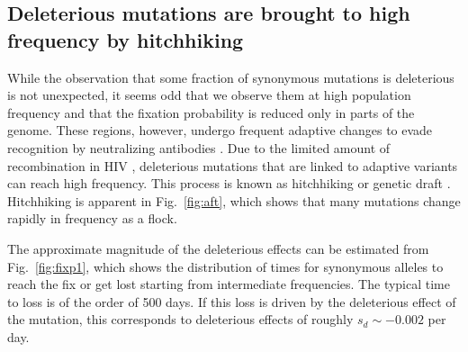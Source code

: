 \documentclass[rmp, twocolumn]{revtex4}
\newcommand{\FIG}[1]{Fig.~\ref{fig:#1}}
\begin{document}
\subsection{Deleterious mutations are brought to high frequency by hitchhiking}

While the observation that some fraction of synonymous mutations is deleterious
is not unexpected, it seems odd that we observe them at high population
frequency and that the fixation probability is reduced only in parts of the
genome. These regions, however, undergo frequent adaptive changes to evade
recognition by neutralizing antibodies \cite{williamson_adaptation_2003,
richman_rapid_2003}. Due to the limited amount of recombination in HIV
\cite{neher_recombination_2010, batorsky_estimate_2011}, deleterious mutations
that are linked to adaptive variants can reach high frequency. This process is
known as hitchhiking \citep{smith_hitch-hiking_1974} or genetic draft
\citep{gillespie_genetic_2000,neher_genetic_2011}. Hitchhiking is  apparent in
\FIG{aft}, which shows that many mutations change rapidly in frequency as a
flock. 

The approximate magnitude of the deleterious effects can be estimated from
\FIG{fixp1}, which shows the distribution of times for synonymous
alleles to reach the fix or get lost starting from intermediate frequencies. The
typical time to loss is of the order of 500 days. If this loss is driven by the
deleterious effect of the mutation, this corresponds to deleterious effects of
roughly $s_d \sim - 0.002$ per day.
\end{document}
